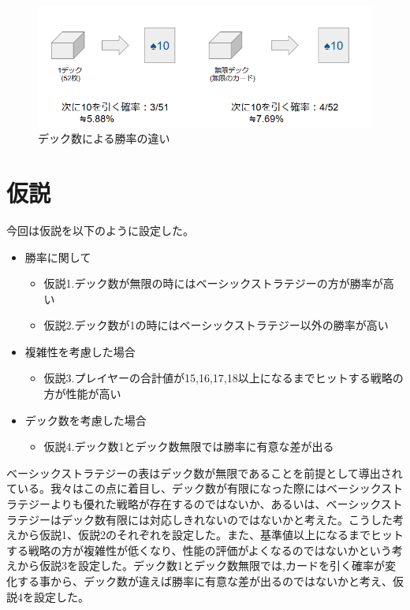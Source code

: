 \begin{figure}[H]
\begin{center}

 \includegraphics[width=0.7\linewidth]{./figure/DeckDiff.PNG}
 \caption{デック数による勝率の違い \label{hogehoge}}
\end{center}
\end{figure}


\section{仮説}
今回は仮説を以下のように設定した。
\begin{itemize}
\item 勝率に関して
    \begin{itemize}
        \item 仮説1.デック数が無限の時にはベーシックストラテジーの方が勝率が高い
        \item 仮説2.デック数が1の時にはベーシックストラテジー以外の勝率が高い
    \end{itemize}
\item 複雑性を考慮した場合
    \begin{itemize}
        \item 仮説3.プレイヤーの合計値が15,16,17,18以上になるまでヒットする戦略の方が性能が高い
    \end{itemize}
\item デック数を考慮した場合
    \begin{itemize}
        \item 仮説4.デック数1とデック数無限では勝率に有意な差が出る
    \end{itemize}
\end{itemize}
ベーシックストラテジーの表はデック数が無限であることを前提として導出されている。我々はこの点に着目し、デック数が有限になった際にはベーシックストラテジーよりも優れた戦略が存在するのではないか、あるいは、ベーシックストラテジーはデック数有限には対応しきれないのではないかと考えた。こうした考えから仮説1、仮説2のそれぞれを設定した。また、基準値以上になるまでヒットする戦略の方が複雑性が低くなり、性能の評価がよくなるのではないかという考えから仮説3を設定した。デック数1とデック数無限では,カードを引く確率が変化する事から、デック数が違えば勝率に有意な差が出るのではないかと考え、仮説4を設定した。

